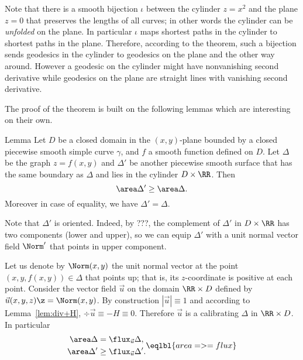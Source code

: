 Note that there is a smooth bijection $\iota$ between the cylinder $z=x^2$ and the plane $z=0$ that preserves the lengths of all curves; in other words the cylinder can be \emph{unfolded} on the plane.
In particular $\iota$ maps shortest paths in the cylinder to shortest paths in the plane.
Therefore, according to the theorem, such a bijection sends geodesics in the cylinder to geodesics on the plane and the other way around. 
However a geodesic on the cylinder might have nonvanishing second derivative while geodesics on the plane are straight lines with vanishing second derivative.
















The proof of the theorem is built on the following lemmas which are interesting on their own.

\begin{thm}{Lemma}
Let $D$ be a closed domain in the $(x,y)$-plane bounded by a closed piecewise smooth simple curve $\gamma$,
and $f$ a smooth function defined on $D$.
Let $\Delta$ be the graph $z=f(x,y)$ and $\Delta'$ be another piecewise smooth surface that has the same boundary as $\Delta$ and lies in the cylinder $D\times \RR$.
Then
\[\area\Delta'\ge\area \Delta.\]
Moreover in case of equality, we have $\Delta'=\Delta$.
\end{thm}

Note that $\Delta'$ is oriented.
Indeed, by ???, the complement of $\Delta'$ in $D\times \RR$ has two components (lower and upper), so we can equip $\Delta'$ with a unit normal vector field $\Norm'$ that points in upper component. 

Let us denote by $\Norm(x,y)$ the unit normal vector at the point $(x,y,f(x,y))\in\Delta$ that points up;
that is, its $z$-coordinate is positive at each point.
Consider the vector field $\vec u$ on the domain $\RR\times D$ defined by 
$\vec u(x,y,z)\z=\Norm (x,y)$.
By construction $|\vec u|\equiv 1$ and according to Lemma~\ref{lem:div+H}, $\div \vec u\equiv -H\equiv 0$.
Therefore $\vec u$ is a calibrating $\Delta$ in $\RR\times D$.
In particular
\[\begin{aligned}
\area \Delta&=\flux_{\vec u}\Delta,
\\
\area \Delta'&\ge\flux_{\vec u}\Delta'.
\end{aligned}
\eqlbl{area=>=flux}\]

